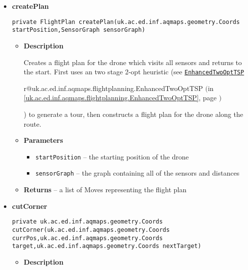 \documentclass[11pt,a4paper]{report}
\makeatletter
\newcommand{\refdefined}[1]{
\expandafter\ifx\csname r@#1\endcsname\relax
\relax\else
{$($in \ref{#1}, page \pageref{#1}$)$}\fi}
\makeatother
\begin{document}
{{{{{{{{{{{{{{{{{{\begin{itemize}
{\begin{itemize}
{Create a flight plan for the drone which visits all sensors and returns to the start. Runs the algorithm a large number of times with different random seeds, in parallel, and chooses the shortest.
}
\item{
{\bf  Parameters}
  \begin{itemize}
   \item{
\texttt{startPosition} -- the starting position of the drone}
  \end{itemize}
}%
\item{{\bf  Returns} -- 
a list of Moves representing the flight plan 
}%
\end{itemize}
}%
\item{ 
\hypertarget{uk.ac.ed.inf.aqmaps.flightplanning.FlightPlanner.createPlan(uk.ac.ed.inf.aqmaps.geometry.Coords, uk.ac.ed.inf.aqmaps.flightplanning.SensorGraph)}{{\bf  createPlan}\\}
\begin{lstlisting}[frame=none]
private FlightPlan createPlan(uk.ac.ed.inf.aqmaps.geometry.Coords startPosition,SensorGraph sensorGraph)\end{lstlisting} %
\begin{itemize}
\item{
{\bf  Description}

Creates a flight plan for the drone which visits all sensors and returns to the start. First uses an two stage 2-opt heuristic (see \texttt{\small \hyperlink{uk.ac.ed.inf.aqmaps.flightplanning.EnhancedTwoOptTSP}{EnhancedTwoOptTSP}}{\small 
\refdefined{uk.ac.ed.inf.aqmaps.flightplanning.EnhancedTwoOptTSP}}) to generate a tour, then constructs a flight plan for the drone along the route.
}
\item{
{\bf  Parameters}
  \begin{itemize}
   \item{
\texttt{startPosition} -- the starting position of the drone}
   \item{
\texttt{sensorGraph} -- the graph containing all of the sensors and distances}
  \end{itemize}
}%
\item{{\bf  Returns} -- 
a list of Moves representing the flight plan 
}%
\end{itemize}
}%
\item{ 
\hypertarget{uk.ac.ed.inf.aqmaps.flightplanning.FlightPlanner.cutCorner(uk.ac.ed.inf.aqmaps.geometry.Coords, uk.ac.ed.inf.aqmaps.geometry.Coords, uk.ac.ed.inf.aqmaps.geometry.Coords)}{{\bf  cutCorner}\\}
\begin{lstlisting}[frame=none]
private uk.ac.ed.inf.aqmaps.geometry.Coords cutCorner(uk.ac.ed.inf.aqmaps.geometry.Coords currPos,uk.ac.ed.inf.aqmaps.geometry.Coords target,uk.ac.ed.inf.aqmaps.geometry.Coords nextTarget)\end{lstlisting} %
\begin{itemize}
\item{
{\bf  Description}

}
\end{itemize}}
\end{itemize}}}}}}}}}}}}}}}}}}}
\end{document}
